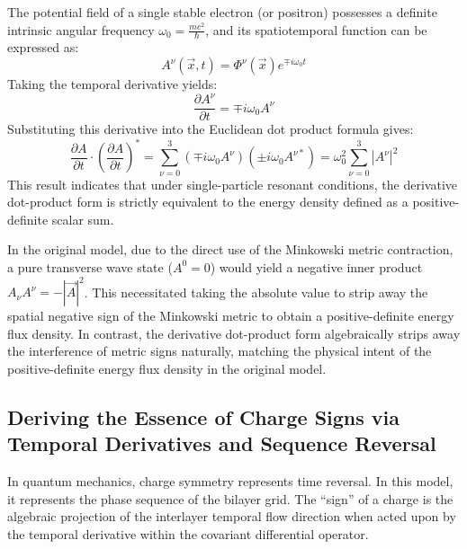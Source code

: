 \documentclass[12pt, a4paper]{article}
\begin{document}
The potential field of a single stable electron (or positron) possesses a definite intrinsic angular frequency $\omega_0 = \frac{mc^2}{\hbar}$, and its spatiotemporal function can be expressed as:
\begin{equation}
A^\nu(\vec{x}, t) = \Phi^\nu(\vec{x}) e^{\mp i \omega_0 t}
\end{equation}
Taking the temporal derivative yields:
\begin{equation}
\frac{\partial A^\nu}{\partial t} = \mp i \omega_0 A^\nu
\end{equation}
Substituting this derivative into the Euclidean dot product formula gives:
\begin{equation}
\frac{\partial A}{\partial t} \cdot \left( \frac{\partial A}{\partial t} \right)^* = \sum_{\nu=0}^{3} \left( \mp i \omega_0 A^\nu \right) \left( \pm i \omega_0 A^{\nu*} \right) = \omega_0^2 \sum_{\nu=0}^{3} |A^\nu|^2
\end{equation}
This result indicates that under single-particle resonant conditions, the derivative dot-product form is strictly equivalent to the energy density defined as a positive-definite scalar sum.

In the original model, due to the direct use of the Minkowski metric contraction, a pure transverse wave state ($A^0 = 0$) would yield a negative inner product $A_\nu A^\nu = -|\vec{A}|^2$. This necessitated taking the absolute value to strip away the spatial negative sign of the Minkowski metric to obtain a positive-definite energy flux density. In contrast, the derivative dot-product form algebraically strips away the interference of metric signs naturally, matching the physical intent of the positive-definite energy flux density in the original model.

\subsection{Deriving the Essence of Charge Signs via Temporal Derivatives and Sequence Reversal}

In quantum mechanics, charge symmetry represents time reversal. In this model, it represents the phase sequence of the bilayer grid. The ``sign'' of a charge is the algebraic projection of the interlayer temporal flow direction when acted upon by the temporal derivative within the covariant differential operator.
\end{document}
